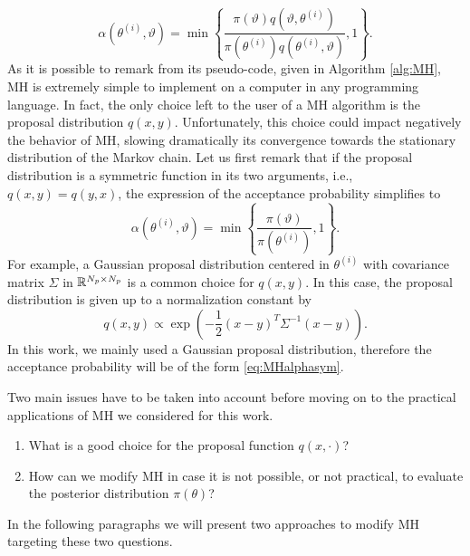 \begin{equation}\label{eq:MHalpha}
	\alpha(\theta^{(i)}, \vartheta) = \min\left\{\frac{\pi(\vartheta)q(\vartheta, \theta^{(i)})}{\pi(\theta^{(i)})q(\theta^{(i)}, \vartheta)}, 1\right\}.
\end{equation}
As it is possible to remark from its pseudo-code, given in Algorithm \ref{alg:MH}, MH is extremely simple to implement on a computer in any programming language. In fact, the only choice left to the user of a MH algorithm is the proposal distribution $q(x,y)$. Unfortunately, this choice could impact negatively the behavior of MH, slowing dramatically its convergence towards the stationary distribution of the Markov chain. Let us first remark that if the proposal distribution is a symmetric function in its two arguments, i.e., $q(x, y) = q(y, x)$,  the expression of the acceptance probability simplifies to
\begin{equation}\label{eq:MHalphasym}
	\alpha(\theta^{(i)}, \vartheta) = \min\left\{\frac{\pi(\vartheta)}{\pi(\theta^{(i)})}, 1\right\}.
\end{equation}
For example, a Gaussian proposal distribution centered in $\theta^{(i)}$ with covariance matrix $\Sigma$ in $\mathbb{R}^{N_p\times N_p}$ is a common choice for $q(x, y)$. In this case, the proposal distribution is given up to a normalization constant by
\begin{equation}\label{eq:gaussianProp}
	q(x, y) \propto \exp(-\frac{1}{2}(x - y)^T\Sigma^{-1}(x - y)).
\end{equation}
In this work, we mainly used a Gaussian proposal distribution, therefore the acceptance probability will be of the form \eqref{eq:MHalphasym}. 

Two main issues have to be taken into account before moving on to the practical applications of MH we considered for this work.
\begin{enumerate}
	\item What is a good choice for the proposal function $q(x, \cdot)$?
	\item How can we modify MH in case it is not possible, or not practical, to evaluate the posterior distribution $\pi(\theta)$?
\end{enumerate}
In the following paragraphs we will present two approaches to modify MH targeting these two questions. 


